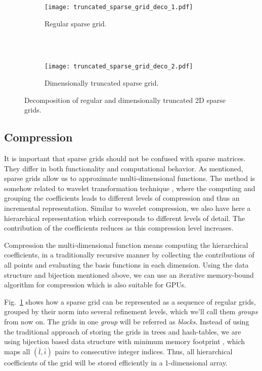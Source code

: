 \begin{figure}[t]
  \begin{subfigure}[b]{1\linewidth}
    \centering
    \texttt{[image: truncated\_sparse\_grid\_deco\_1.pdf]}
    \caption{Regular sparse grid.}
    \label{fig:truncated_sparse_grid_deco_1}
  \end{subfigure}
  \\ \\
  \begin{subfigure}[b]{1\linewidth}
    \centering
    \texttt{[image: truncated\_sparse\_grid\_deco\_2.pdf]}
    \caption{Dimensionally truncated sparse grid.}
    \label{fig:truncated_sparse_grid_deco_2}
  \end{subfigure}
  \caption{Decomposition of regular and dimensionally truncated 2D sparse
  grids.}
  \label{fig:truncated_sparse_grid_deco}
\end{figure}

\subsection{Compression}

It is important that sparse grids should not be confused with sparse matrices.
They differ in both functionality and computational behavior. As mentioned,
sparse grids allow us to approximate multi-dimensional functions. The method is
somehow related to wavelet transformation technique \cite{Mallat89atheory},
where the computing and grouping the coefficients leads to different levels of
compression and thus an incremental representation. Similar to wavelet
compression, we also have here a hierarchical representation which corresponds
to different levels of detail. The contribution of the coefficients reduces as
this compression level increases.

Compression the multi-dimensional function means computing the hierarchical
coefficients, in a traditionally recursive manner by collecting the
contributions of all points and evaluating the basis functions in each
dimension. Using the data structure and bijection mentioned above, we can use an
iterative memory-bound algorithm for compression which is also suitable for
GPUs.

Fig.~\ref{fig:truncated_sparse_grid_deco_1} shows how a sparse grid can be
represented as a sequence of regular grids, grouped by their norm into several
refinement levels, which we'll call them \textit{groups} from now on. The grids
in one \textit{group} will be referred as \textit{blocks}. Instead of using the
traditional approach of storing the grids in trees and hash-tables, we are using
bijection based data structure with minimum memory footprint
\cite{Murarasu:2011:CDS:1941553.1941559}, which maps all $(\bar{l},\bar{i})$
pairs to consecutive integer indices. Thus, all hierarchical coefficients of the
grid will be stored efficiently in a 1-dimensional array.

